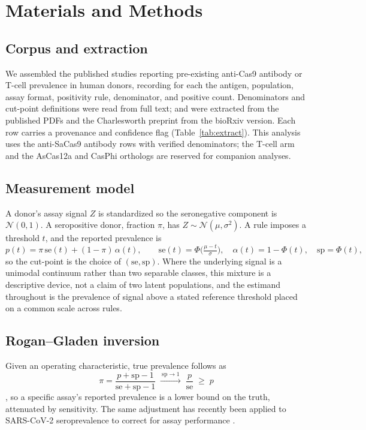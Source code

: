 \documentclass[11pt]{article}
\begin{document}
\section{Materials and Methods}
\subsection{Corpus and extraction}
We assembled the published studies reporting pre-existing anti-Cas9 antibody or T-cell prevalence in human donors, recording for each the antigen, population, assay format, positivity rule, denominator, and positive count. Denominators and cut-point definitions were read from full text; \citet{charlesworth2019} and \citet{wagner2018} were extracted from the published PDFs and the Charlesworth preprint from the bioRxiv version. Each row carries a provenance and confidence flag (Table~\ref{tab:extract}). This analysis uses the anti-SaCas9 antibody rows with verified denominators; the T-cell arm and the AsCas12a and CasPhi orthologs are reserved for companion analyses.

\subsection{Measurement model}
A donor's assay signal $Z$ is standardized so the seronegative component is $\mathcal{N}(0,1)$. A seropositive donor, fraction $\pi$, has $Z \sim \mathcal{N}(\mu,\sigma^2)$. A rule imposes a threshold $t$, and the reported prevalence is
\begin{equation}
p(t) = \pi\,\mathrm{se}(t) + (1-\pi)\,\alpha(t), \qquad
\mathrm{se}(t)=\Phi\!\Big(\tfrac{\mu-t}{\sigma}\Big),\quad \alpha(t)=1-\Phi(t),\quad \mathrm{sp}=\Phi(t),
\end{equation}
so the cut-point is the choice of $(\mathrm{se},\mathrm{sp})$. Where the underlying signal is a unimodal continuum rather than two separable classes, this mixture is a descriptive device, not a claim of two latent populations, and the estimand throughout is the prevalence of signal above a stated reference threshold placed on a common scale across rules.

\subsection{Rogan--Gladen inversion}
Given an operating characteristic, true prevalence follows as
\begin{equation}
\pi = \frac{p + \mathrm{sp} - 1}{\mathrm{se} + \mathrm{sp} - 1} \;\xrightarrow{\ \mathrm{sp}\to 1\ }\; \frac{p}{\mathrm{se}} \;\ge\; p
\end{equation}
\citep{rogan1978}, so a specific assay's reported prevalence is a lower bound on the truth, attenuated by sensitivity. The same adjustment has recently been applied to SARS-CoV-2 seroprevalence to correct for assay performance \citep{chen2025}.
\end{document}
